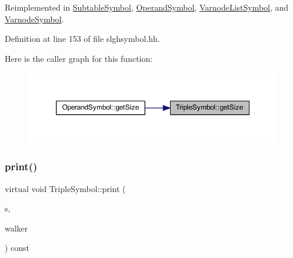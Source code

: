 Reimplemented in \mbox{\hyperlink{class_subtable_symbol_a34643b05651a29f4568b69aa208b1e3a}{Subtable\+Symbol}}, \mbox{\hyperlink{class_operand_symbol_a9082a923e1e8f929c9fc0409f14fac74}{Operand\+Symbol}}, \mbox{\hyperlink{class_varnode_list_symbol_a5958ff2358b0884cf1696eff69d51a18}{Varnode\+List\+Symbol}}, and \mbox{\hyperlink{class_varnode_symbol_a3e37b8884d830c54656a43e6b2e1712b}{Varnode\+Symbol}}.



Definition at line 153 of file slghsymbol.\+hh.

Here is the caller graph for this function\+:
\nopagebreak
\begin{figure}[H]
\begin{center}
\leavevmode
\includegraphics[width=350pt]{class_triple_symbol_a7351de4a1db140381d0b7913a8c613fd_icgraph}
\end{center}
\end{figure}
\mbox{\label{class_triple_symbol_a205c4487d3ad54532097dd77eb4501fc}} 
\subsubsection{\texorpdfstring{print()}{print()}}
{\footnotesize\ttfamily virtual void Triple\+Symbol\+::print (\begin{DoxyParamCaption}\item[{ostream \&}]{s,  }\item[{\mbox{\hyperlink{class_parser_walker}{Parser\+Walker}} \&}]{walker }\end{DoxyParamCaption}) const\hspace{0.3cm}{\ttfamily [pure virtual]}}



